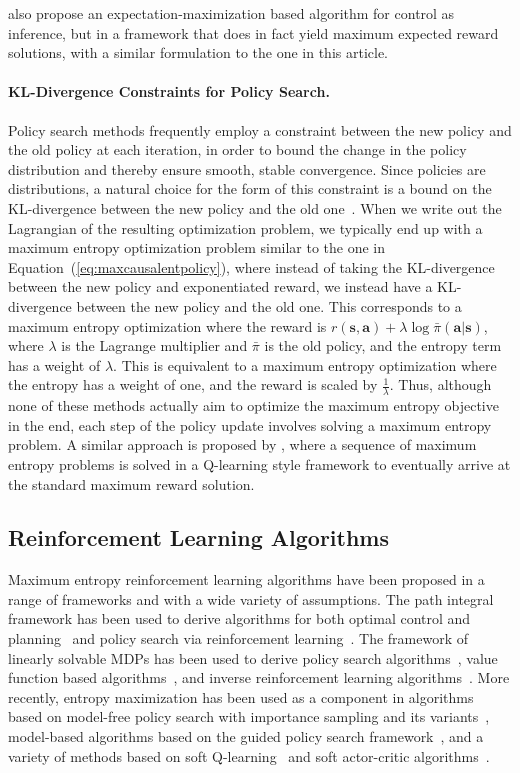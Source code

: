 \citet{toussaint06} also propose an expectation-maximization based algorithm for control as inference, but in a framework that does in fact yield maximum expected reward solutions, with a similar formulation to the one in this article.

\paragraph{KL-Divergence Constraints for Policy Search.} Policy search methods frequently employ a constraint between the new policy and the old policy at each iteration, in order to bound the change in the policy distribution and thereby ensure smooth, stable convergence. Since policies are distributions, a natural choice for the form of this constraint is a bound on the KL-divergence between the new policy and the old one~\citep{covariant,reps,mfgps,trpo,mpo}. When we write out the Lagrangian of the resulting optimization problem, we typically end up with a maximum entropy optimization problem similar to the one in Equation~(\ref{eq:maxcausalentpolicy}), where instead of taking the KL-divergence between the new policy and exponentiated reward, we instead have a KL-divergence between the new policy and the old one. This corresponds to a maximum entropy optimization where the reward is $r(\mathbf{s},\mathbf{a}) + \lambda \log \bar{\pi}(\mathbf{a}|\mathbf{s})$, where $\lambda$ is the Lagrange multiplier and $\bar{\pi}$ is the old policy, and the entropy term has a weight of $\lambda$. This is equivalent to a maximum entropy optimization where the entropy has a weight of one, and the reward is scaled by $\frac{1}{\lambda}$. Thus, although none of these methods actually aim to optimize the maximum entropy objective in the end, each step of the policy update involves solving a maximum entropy problem. A similar approach is proposed by \citet{rawlik_soc}, where a sequence of maximum entropy problems is solved in a Q-learning style framework to eventually arrive at the standard maximum reward solution.

\subsection{Reinforcement Learning Algorithms}
\label{sec:algorithms}

Maximum entropy reinforcement learning algorithms have been proposed in a range of frameworks and with a wide variety of assumptions. The path integral framework has been used to derive algorithms for both optimal control and planning~\citep{kappen_oc} and policy search via reinforcement learning~\citep{pi2}. The framework of linearly solvable MDPs has been used to derive policy search algorithms~\citep{lmdp_policy}, value function based algorithms~\citep{todorov_lmdp}, and inverse reinforcement learning algorithms~\citep{ldmp_irl}. More recently, entropy maximization has been used as a component in algorithms based on model-free policy search with importance sampling and its variants~\citep{gps,pcl,trust_pcl}, model-based algorithms based on the guided policy search framework~\citep{mfgps,cgps,endtoend}, and a variety of methods based on soft Q-learning~\citep{haarnoja,schulman} and soft actor-critic algorithms~\citep{sac,hausman}.

